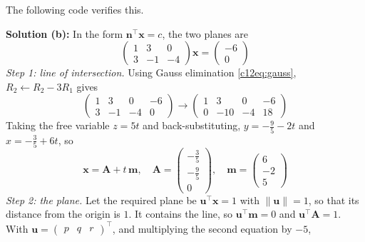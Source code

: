 The following code verifies this.

\nopagebreak[4]
\begin{center}
\end{center}

\textbf{Solution (b):} In the form $\mathbf{n}^{\top}\mathbf{x} = c$, the two planes are
\begin{equation}
\begin{pmatrix} 1 & 3 & 0 \\ 3 & -1 & -4 \end{pmatrix}\mathbf{x} = \begin{pmatrix} -6 \\ 0 \end{pmatrix}
\end{equation}
\emph{Step 1: line of intersection.} Using Gauss elimination \eqref{c12eq:gauss}, $R_2 \leftarrow R_2 - 3R_1$ gives
\begin{equation}
\left(\begin{array}{ccc|c} 1 & 3 & 0 & -6 \\ 3 & -1 & -4 & 0 \end{array}\right) \longrightarrow
\left(\begin{array}{ccc|c} 1 & 3 & 0 & -6 \\ 0 & -10 & -4 & 18 \end{array}\right)
\end{equation}
Taking the free variable $z = 5t$ and back-substituting, $y = -\frac{9}{5} - 2t$ and $x = -\frac{3}{5} + 6t$, so
\begin{equation}
\mathbf{x} = \mathbf{A} + t\,\mathbf{m}, \quad
\mathbf{A} = \begin{pmatrix} -\frac{3}{5} \\ -\frac{9}{5} \\ 0 \end{pmatrix}, \quad
\mathbf{m} = \begin{pmatrix} 6 \\ -2 \\ 5 \end{pmatrix}
\end{equation}
\emph{Step 2: the plane.} Let the required plane be $\mathbf{u}^{\top}\mathbf{x} = 1$ with $\|\mathbf{u}\| = 1$, so that its distance from the origin is $1$. It contains the line, so $\mathbf{u}^{\top}\mathbf{m} = 0$ and $\mathbf{u}^{\top}\mathbf{A} = 1$. With $\mathbf{u} = \begin{pmatrix} p & q & r \end{pmatrix}^{\top}$, and multiplying the second equation by $-5$,

